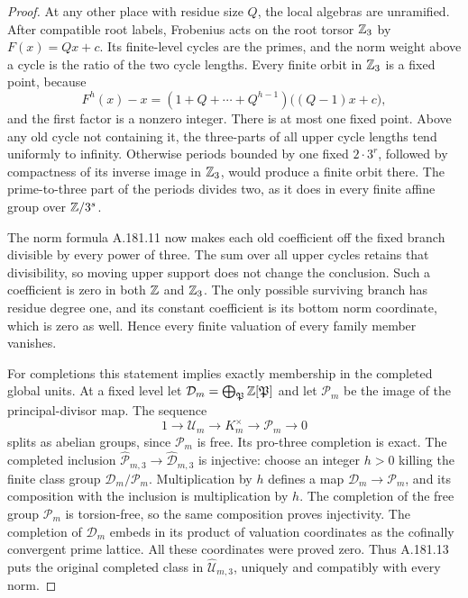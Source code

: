 \begin{proof}
At any other place with residue size \(Q\), the local algebras
are unramified.  After compatible root labels, Frobenius acts on
the root torsor \(\mathbb Z_3\) by \(F(x)=Qx+c\).
Its finite-level cycles are the primes, and the norm weight
above a cycle is the ratio of the two cycle lengths.  Every
finite orbit in \(\mathbb Z_3\) is a fixed point, because
\[
 F^h(x)-x=(1+Q+\cdots+Q^{h-1})\bigl((Q-1)x+c\bigr),
\tag{A.181.12}
\]
and the first factor is a nonzero integer.  There is at most
one fixed point.  Above any old cycle not containing it, the
three-parts of all upper cycle lengths tend uniformly to
infinity.  Otherwise periods bounded by one fixed
\(2\cdot3^r\), followed by compactness of its inverse
image in \(\mathbb Z_3\), would produce a finite orbit there.
The prime-to-three part of the periods divides two, as it
does in every finite affine group over \(\mathbb Z/3^s\).

The norm formula A.181.11 now makes each old coefficient off
the fixed branch divisible by every power of three.  The sum
over all upper cycles retains that divisibility, so moving
upper support does not change the conclusion.  Such a
coefficient is zero in both \(\mathbb Z\) and \(\mathbb Z_3\).
The only possible surviving branch has residue degree one,
and its constant coefficient is its bottom norm coordinate,
which is zero as well.  Hence every finite valuation of
every family member vanishes.

For completions this statement implies exactly membership in
the completed global units.  At a fixed level let
\(\mathcal D_m=\bigoplus_{\mathfrak P}\mathbb Z[\mathfrak P]\)
and let \(\mathcal P_m\) be the image of the principal-divisor
map.  The sequence
\[
 1\longrightarrow\mathcal U_m\longrightarrow K_m^\times
      \longrightarrow\mathcal P_m\longrightarrow0
\tag{A.181.13}
\]
splits as abelian groups, since \(\mathcal P_m\) is free.
Its pro-three completion is exact.  The completed inclusion
\(\widehat{\mathcal P}_{m,3}\to
\widehat{\mathcal D}_{m,3}\) is injective: choose an
integer \(h>0\) killing the finite class group
\(\mathcal D_m/\mathcal P_m\).  Multiplication by \(h\)
defines a map \(\mathcal D_m\to\mathcal P_m\), and its
composition with the inclusion is multiplication by \(h\).
The completion of the free group \(\mathcal P_m\) is
torsion-free, so the same composition proves injectivity.
The completion of \(\mathcal D_m\) embeds in its product
of valuation coordinates as the cofinally convergent prime
lattice.  All these coordinates were proved zero.  Thus
A.181.13 puts the original completed class in
\(\widehat{\mathcal U}_{m,3}\), uniquely and compatibly
with every norm.


\end{proof}
